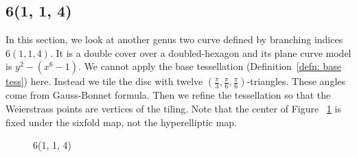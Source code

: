 \documentclass[12pt,reqno]{amsart}
\theoremstyle{definition}
\theoremstyle{remark}
\begin{document}
\subsection{6(1, 1, 4)}

In this section, we look at another genus two curve defined by branching indices $6(1, 1, 4).$ It is a double cover over a doubled-hexagon and its plane curve model is $y^2 - (x^6 - 1).$ We cannot apply the base tessellation (Definition~\ref{defn: base tess}) here. Instead we tile the disc with twelve $(\frac{\pi}{3}, \frac{\pi}{6}, \frac{\pi}{6})$-triangles. These angles come from Gauss-Bonnet formula. Then we refine the tessellation so that the Weierstrass points are vertices of the tiling. Note that the center of Figure~ \cref{fig:114} is fixed under the sixfold map, not the hyperelliptic map. 

\begin{figure}[htbp]
    \centering
    \qquad
    \caption{6(1, 1, 4)}%
    \label{fig:114}%
\end{figure}
\end{document}
